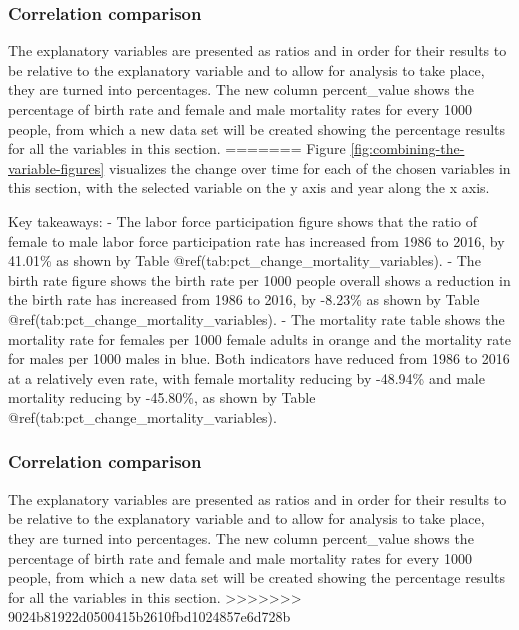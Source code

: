 \documentclass[11pt,a4paper,]{article}
\begin{document}
\subsubsection{Correlation comparison}\label{correlation-comparison}

The explanatory variables are presented as ratios and in order for their
results to be relative to the explanatory variable and to allow for
analysis to take place, they are turned into percentages. The new column
percent\_value shows the percentage of birth rate and female and male
mortality rates for every 1000 people, from which a new data set will be
created showing the percentage results for all the variables in this
section.
=======
Figure \ref{fig:combining-the-variable-figures} visualizes the change over time for each of the chosen variables in this section, with the selected variable on the y axis and year along the x axis.

Key takeaways:
- The labor force participation figure shows that the ratio of female to male labor force participation rate has increased from 1986 to 2016, by 41.01\% as shown by Table @ref(tab:pct\_change\_mortality\_variables).
- The birth rate figure shows the birth rate per 1000 people overall shows a reduction in the birth rate has increased from 1986 to 2016, by -8.23\% as shown by Table @ref(tab:pct\_change\_mortality\_variables).
- The mortality rate table shows the mortality rate for females per 1000 female adults in orange and the mortality rate for males per 1000 males in blue. Both indicators have reduced from 1986 to 2016 at a relatively even rate, with female mortality reducing by -48.94\% and male mortality reducing by -45.80\%, as shown by Table @ref(tab:pct\_change\_mortality\_variables).

\hypertarget{correlation-comparison}{%
\subsubsection{Correlation comparison}\label{correlation-comparison}}

The explanatory variables are presented as ratios and in order for their results to be relative to the explanatory variable and to allow for analysis to take place, they are turned into percentages. The new column percent\_value shows the percentage of birth rate and female and male mortality rates for every 1000 people, from which a new data set will be created showing the percentage results for all the variables in this section.
>>>>>>> 9024b81922d0500415b2610fbd1024857e6d728b
\end{document}
